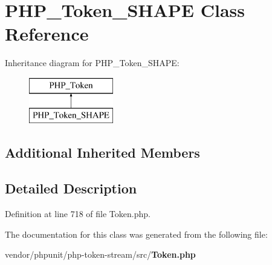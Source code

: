 \section{P\+H\+P\+\_\+\+Token\+\_\+\+S\+H\+A\+P\+E Class Reference}
\label{class_p_h_p___token___s_h_a_p_e}
Inheritance diagram for P\+H\+P\+\_\+\+Token\+\_\+\+S\+H\+A\+P\+E\+:\begin{figure}[H]
\begin{center}
\leavevmode
\includegraphics[height=2.000000cm]{class_p_h_p___token___s_h_a_p_e}
\end{center}
\end{figure}
\subsection*{Additional Inherited Members}


\subsection{Detailed Description}


Definition at line 718 of file Token.\+php.



The documentation for this class was generated from the following file\+:\begin{DoxyCompactItemize}
\item 
vendor/phpunit/php-\/token-\/stream/src/{\bf Token.\+php}\end{DoxyCompactItemize}
